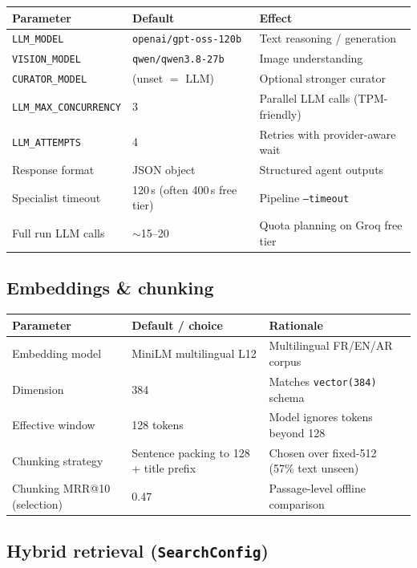 \documentclass[11pt,a4paper]{article}
\begin{document}
\begin{tabular}{@{}llp{7.5cm}@{}}
\toprule
\textbf{Parameter} & \textbf{Default} & \textbf{Effect} \\
\midrule
\texttt{LLM\_MODEL} & \texttt{openai/gpt-oss-120b} & Text reasoning / generation \\
\texttt{VISION\_MODEL} & \texttt{qwen/qwen3.8-27b} & Image understanding \\
\texttt{CURATOR\_MODEL} & (unset $=$ LLM) & Optional stronger curator \\
\texttt{LLM\_MAX\_CONCURRENCY} & 3 & Parallel LLM calls (TPM-friendly) \\
\texttt{LLM\_ATTEMPTS} & 4 & Retries with provider-aware wait \\
Response format & JSON object & Structured agent outputs \\
Specialist timeout & 120\,s (often 400\,s free tier) & Pipeline \texttt{--timeout} \\
Full run LLM calls & $\sim$15--20 & Quota planning on Groq free tier \\
\bottomrule
\end{tabular}

\subsection{Embeddings \& chunking}

\begin{tabular}{@{}llp{7.5cm}@{}}
\toprule
\textbf{Parameter} & \textbf{Default / choice} & \textbf{Rationale} \\
\midrule
Embedding model & MiniLM multilingual L12 & Multilingual FR/EN/AR corpus \\
Dimension & 384 & Matches \texttt{vector(384)} schema \\
Effective window & 128 tokens & Model ignores tokens beyond 128 \\
Chunking strategy & Sentence packing to 128 + title prefix & Chosen over fixed-512 (57\% text unseen) \\
Chunking MRR@10 (selection) & 0.47 & Passage-level offline comparison \\
\bottomrule
\end{tabular}

\subsection{Hybrid retrieval (\texttt{SearchConfig})}
\end{document}
